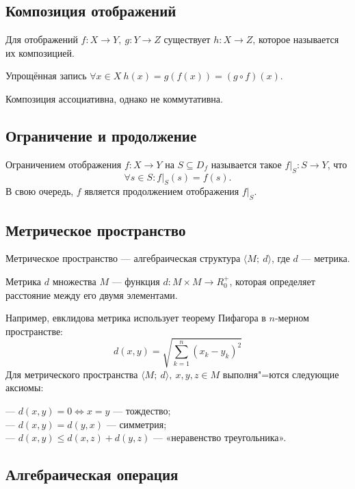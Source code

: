 \subsection{Композиция отображений}

Для отображений $f\colon X\to Y,\ g\colon Y\to Z$ существует $h\colon X\to Z$,
которое называется их {\bold композицией}.\par

Упрощённая запись $\forall x\in X\ h(x)=g(f(x))=(g\circ f)(x)$.

Композиция {\ital ассоциативна}, однако {\ital не коммутативна}.

\subsection{Ограничение и продолжение}

{\ital Ограничением} отображения $f\colon X\to Y$ на $S\subseteq D_f$ называется
такое $f\vert_S\colon S\to Y$, что
$$\forall s\in S\colon f\vert_S(s)=f(s).$$
В свою очередь, $f$ является {\ital продолжением} отображения $f\vert_S$.\par

\subsection{Метрическое пространство}

{\ital Метрическое пространство} --- алгебраическая структура $\langle M;\ d\rangle$,
где $d$ --- метрика.\par

Метрика $d$ множества $M$ --- функция $d\colon M\times M\to R^+_0$, которая
определяет {\ital расстояние} между его двумя элементами.\par

Например, {\ital евклидова метрика} использует теорему Пифагора в $n$-мерном
пространстве:
$$d(x,y)=\sqrt{\sum^{n}_{k=1}(x_k-y_k)^2}$$
Для метрического пространства $\langle M;\ d\rangle,\ x,y,z\in M$ выполня"=ются
следующие {\ital аксиомы}:\par

--- $d(x,y)=0\iff x=y$ --- {\ital тождество};\\
--- $d(x,y)=d(y,x)$ --- {\ital симметрия};\\
--- $d(x,y)\leq d(x,z) + d(y,z)$ --- {\ital «неравенство треугольника»}.

\subsection{Алгебраическая операция}

